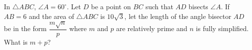 In $\triangle ABC$, $\angle A = 60^\circ$. Let $D$ be a point on $BC$ such that $AD$ bisects $\angle A$. If $AB = 6$ and the area of $\triangle ABC$ is $10\sqrt{3}$, let the length of the angle bisector $AD$ be in the form $\dfrac{m\sqrt{n}}{p}$ where $m$ and $p$ are relatively prime and $n$ is fully simplified. What is $m+p$?
